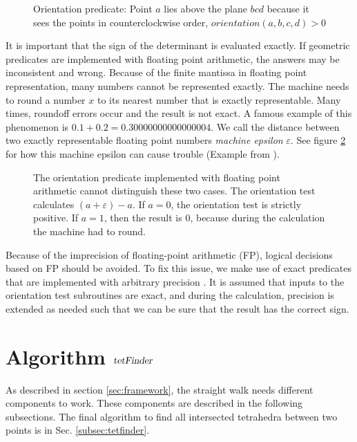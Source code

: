 \documentclass[../thesis.tex]{subfiles}
\begin{document}
\begin{figure}[htb]
  \centering
  \def\svgwidth{20em}
  
  \caption{Orientation predicate: Point $a$ lies above the plane $bcd$ because it sees the points in counterclockwise order, $orientation(a,b,c,d)>0$}
  \label{fig:orient2d}
\end{figure}
It is important that the sign of the determinant is evaluated exactly.
If geometric predicates are implemented with floating point arithmetic,
the answers may be inconsistent and wrong.
Because of the finite mantissa in floating point representation, many numbers cannot be represented exactly.
The machine needs to round a number $x$ to its nearest number that is exactly representable.
Many times, roundoff errors occur and the result is not exact. A famous example of this phenomenon is $0.1 + 0.2 = 0.30000000000000004$.
We call the distance between two exactly representable floating point numbers \emph{machine epsilon} $\varepsilon$.
See figure \ref{fig:floatingpoint} for how this machine epsilon can cause trouble (Example from \cite{Marek}).
\begin{figure}[htb]
  \centering
  \def\svgwidth{20em}
  
  \caption{The orientation predicate implemented with floating point arithmetic cannot distinguish these two cases.
  The orientation test calculates $(a+\varepsilon)-a$. If $a=0$, the orientation test is strictly positive.
  If $a=1$, then the result is $0$, because during the calculation the machine had to round.
  }\label{fig:floatingpoint}
\end{figure}
Because of the imprecision of floating-point arithmetic (FP), logical decisions
based on FP should be avoided.
To fix this issue, we make use of exact predicates that are implemented with arbitrary precision \cite{RichardShewchuk1997}.
It is assumed that inputs to the orientation test subroutines are exact, and during the calculation,
precision is extended as needed such that
we can be sure that the result has the correct sign.


\section{Algorithm $\textsl{tetFinder}$}
As described in section \ref{sec:framework}, the straight walk needs different
components to work. These components are described in the following subsections.
The final algorithm to find all intersected tetrahedra between two points is in Sec. \ref{subsec:tetfinder}.
\end{document}
